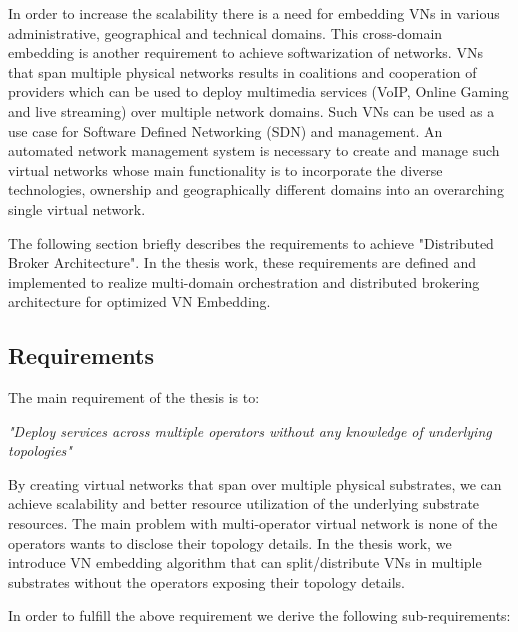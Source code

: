 \documentclass[article,dr=phil,type=msc ,colorback,accentcolor=tud4b]{tudthesis}
\begin{document}
 In order to increase the scalability there is a need for embedding VNs in various administrative, geographical and technical domains. This cross-domain embedding is another requirement to achieve softwarization of networks. VNs that span multiple physical networks results in coalitions and cooperation of providers which can be used to deploy multimedia services (VoIP, Online Gaming and live streaming) over multiple network domains. Such VNs can be used as a use case for Software Defined Networking (SDN) and management. An automated network management system is necessary to create and manage such virtual networks whose main functionality is to incorporate the diverse technologies, ownership and geographically different domains into an overarching single virtual network. \newline
 
 The following section briefly describes the requirements to achieve "Distributed Broker Architecture". In the thesis work, these requirements are defined and implemented to realize multi-domain orchestration and distributed brokering architecture for optimized VN Embedding. \newline
 
\subsection{Requirements}
The main requirement of the thesis is to:\newline 
 
\textit{"Deploy services across multiple operators without any knowledge of underlying topologies"} \newline
 
By creating virtual networks that span over multiple physical substrates, we can achieve scalability and better resource utilization of the underlying substrate resources. The main problem with multi-operator virtual network is none of the operators wants to disclose their topology details. In the thesis work, we introduce VN embedding algorithm that can split/distribute VNs in multiple substrates without the operators exposing their topology details.\newline
 
In order to fulfill the above requirement we derive the following sub-requirements:
 
\end{document}
